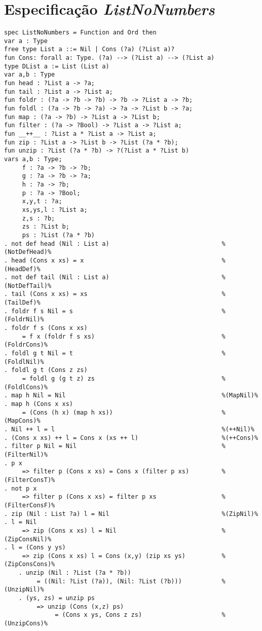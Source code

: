 \section{Especificação \textit{ListNoNumbers}}
\label{appendix:lazySpec:listNoNumbers}
\begin{Verbatim}
spec ListNoNumbers = Function and Ord then
var a : Type
free type List a ::= Nil | Cons (?a) (?List a)?
fun Cons: forall a: Type. (?a) --> (?List a) --> (?List a)
type DList a := List (List a)
var a,b : Type
fun head : ?List a -> ?a;
fun tail : ?List a -> ?List a;
fun foldr : (?a -> ?b -> ?b) -> ?b -> ?List a -> ?b;
fun foldl : (?a -> ?b -> ?a) -> ?a -> ?List b -> ?a;
fun map : (?a -> ?b) -> ?List a -> ?List b;
fun filter : (?a -> ?Bool) -> ?List a -> ?List a;
fun __++__ : ?List a * ?List a -> ?List a;
fun zip : ?List a -> ?List b -> ?List (?a * ?b);
fun unzip : ?List (?a * ?b) -> ?(?List a * ?List b)
vars a,b : Type; 
     f : ?a -> ?b -> ?b; 
     g : ?a -> ?b -> ?a;
     h : ?a -> ?b; 
     p : ?a -> ?Bool; 
     x,y,t : ?a; 
     xs,ys,l : ?List a; 
     z,s : ?b; 
     zs : ?List b; 
     ps : ?List (?a * ?b)
. not def head (Nil : List a)                               %(NotDefHead)%
. head (Cons x xs) = x                                      %(HeadDef)%
. not def tail (Nil : List a)                               %(NotDefTail)%
. tail (Cons x xs) = xs                                     %(TailDef)%
. foldr f s Nil = s                                         %(FoldrNil)%
. foldr f s (Cons x xs) 
     = f x (foldr f s xs)                                   %(FoldrCons)%
. foldl g t Nil = t                                         %(FoldlNil)%
. foldl g t (Cons z zs) 
     = foldl g (g t z) zs                                   %(FoldlCons)%
. map h Nil = Nil                                           %(MapNil)%
. map h (Cons x xs)       
     = (Cons (h x) (map h xs))                              %(MapCons)%
. Nil ++ l = l                                              %(++Nil)%
. (Cons x xs) ++ l = Cons x (xs ++ l)                       %(++Cons)%
. filter p Nil = Nil                                        %(FilterNil)%
. p x  
     => filter p (Cons x xs) = Cons x (filter p xs)         %(FilterConsT)%
. not p x 
     => filter p (Cons x xs) = filter p xs                  %(FilterConsF)%
. zip (Nil : List ?a) l = Nil                               %(ZipNil)%
. l = Nil 
     => zip (Cons x xs) l = Nil                             %(ZipConsNil)%
. l = (Cons y ys) 
     => zip (Cons x xs) l = Cons (x,y) (zip xs ys)          %(ZipConsCons)%
	. unzip (Nil : ?List (?a * ?b)) 
	     = ((Nil: ?List (?a)), (Nil: ?List (?b)))           %(UnzipNil)%
	. (ys, zs) = unzip ps 
	     => unzip (Cons (x,z) ps) 
	          = (Cons x ys, Cons z zs)                      %(UnzipCons)%


\end{Verbatim}
